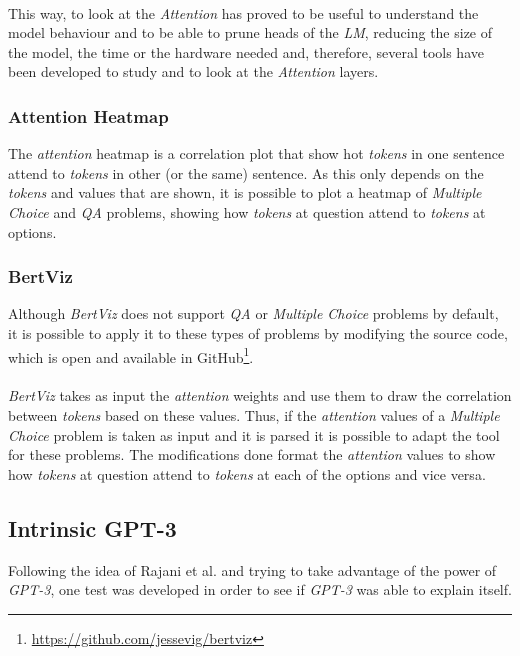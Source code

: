 \paragraph{}
This way, to look at the \emph{Attention} has proved to be useful to understand the model behaviour and to be able to prune heads of the \emph{LM}, reducing the size of the model, the time or the hardware needed and, therefore, several tools have been developed to study and to look at the \emph{Attention} layers.

\subsubsection{Attention Heatmap}
\label{sec:AttentionHeatmap}
\noindent The \emph{attention} heatmap is a correlation plot that show hot \emph{tokens} in one sentence attend to \emph{tokens} in other (or the same) sentence. As this only depends on the \emph{tokens} and values that are shown, it is possible to plot a heatmap of \emph{Multiple Choice} and \emph{QA} problems, showing how \emph{tokens} at question attend to \emph{tokens} at options.

\subsubsection{BertViz}
\label{sec:Bertviz}
\noindent Although \emph{BertViz} does not support \emph{QA} or \emph{Multiple Choice} problems by default, it is possible to apply it to these types of problems by modifying the source code, which is open and available in GitHub\footnote{\url{https://github.com/jessevig/bertviz}}.
\paragraph{}
\emph{BertViz} takes as input the \emph{attention} weights and use them to draw the correlation between \emph{tokens} based on these values. Thus, if the \emph{attention} values of a \emph{Multiple Choice} problem is taken as input and it is parsed it is possible to adapt the tool for these problems. The modifications done format the \emph{attention} values to show how \emph{tokens} at question attend to \emph{tokens} at each of the options and vice versa.

\subsection{Intrinsic GPT-3}
\label{sec:gpt3}
\noindent Following the idea of Rajani et al. \cite{Rajani2019} and trying to take advantage of the power of \emph{GPT-3}, one test was developed in order to see if \emph{GPT-3} was able to explain itself. 
